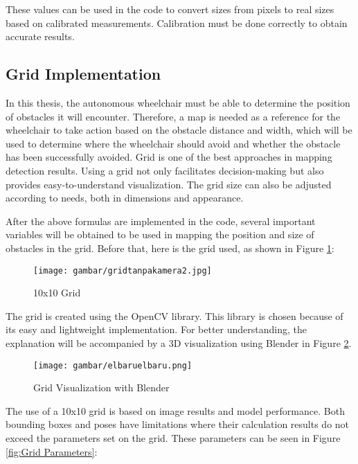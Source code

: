 These values can be used in the code to convert sizes from pixels to real sizes based on calibrated measurements. Calibration must be done correctly to obtain accurate results.

\subsection{Grid Implementation}
In this thesis, the autonomous wheelchair must be able to determine the position of obstacles it will encounter. Therefore, a map is needed as a reference for the wheelchair to take action based on the obstacle distance and width, which will be used to determine where the wheelchair should avoid and whether the obstacle has been successfully avoided. Grid is one of the best approaches in mapping detection results. Using a grid not only facilitates decision-making but also provides easy-to-understand visualization. The grid size can also be adjusted according to needs, both in dimensions and appearance.

After the above formulas are implemented in the code, several important variables will be obtained to be used in mapping the position and size of obstacles in the grid. Before that, here is the grid used, as shown in Figure \ref{fig:Grid10x10}:

\begin{figure}[H]
  \centering
  \texttt{[image: gambar/gridtanpakamera2.jpg]}
  \caption{10x10 Grid}
  \label{fig:Grid10x10}
\end{figure}

The grid is created using the OpenCV library. This library is chosen because of its easy and lightweight implementation. For better understanding, the explanation will be accompanied by a 3D visualization using Blender in Figure \ref{fig:gridxblendxmanusiatengah}.

\begin{figure}[H]
  \centering
  \texttt{[image: gambar/elbaruelbaru.png]}
  \caption{Grid Visualization with Blender}
  \label{fig:gridxblendxmanusiatengah}
\end{figure}


The use of a 10x10 grid is based on image results and model performance. Both bounding boxes and poses have limitations where their calculation results do not exceed the parameters set on the grid. These parameters can be seen in Figure \ref{fig:Grid Parameters}:


